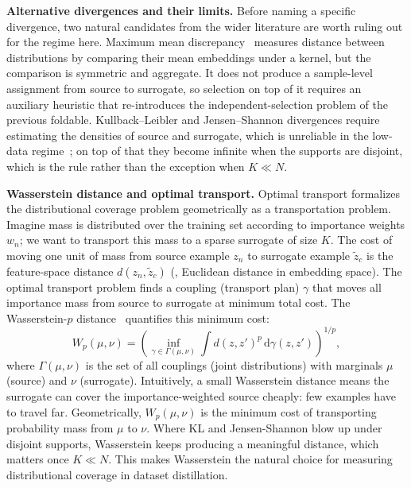 \begin{foldable}
  \textbf{Alternative divergences and their limits.}
  Before naming a specific divergence, two natural candidates from the wider literature are worth ruling out for the regime here.
  Maximum mean discrepancy~\cite{gretton2012kernel} measures distance between distributions by comparing their mean embeddings under a kernel, but the comparison is symmetric and aggregate.
  It does not produce a sample-level assignment from source to surrogate, so selection on top of it requires an auxiliary heuristic that re-introduces the independent-selection problem of the previous foldable.
  Kullback--Leibler and Jensen--Shannon divergences require estimating the densities of source and surrogate, which is unreliable in the low-data regime~\cite{paninski2003estimation}; on top of that they become infinite when the supports are disjoint, which is the rule rather than the exception when $K \ll N$.
\end{foldable}

\begin{foldable}
  \textbf{Wasserstein distance and optimal transport.}
  Optimal transport formalizes the distributional coverage problem geometrically as a transportation problem.
  Imagine mass is distributed over the training set according to importance weights $w_n$; we want to transport this mass to a sparse surrogate of size $K$.
  The cost of moving one unit of mass from source example $z_n$ to surrogate example $\tilde{z}_c$ is the feature-space distance $d(z_n, \tilde{z}_c)$ (\eg, Euclidean distance in embedding space).
  The optimal transport problem finds a coupling (transport plan) $\gamma$ that moves all importance mass from source to surrogate at minimum total cost.
  The Wasserstein-$p$ distance~\cite{villani2008optimal} quantifies this minimum cost:
  \begin{equation}
    \label{eq:wasserstein}
    W_p(\mu, \nu) = \left(\inf_{\gamma \in \Gamma(\mu,\nu)} \int d(z, z')^p \, \text{d}\gamma(z, z') \right)^{1/p},
  \end{equation}
  where $\Gamma(\mu, \nu)$ is the set of all couplings (joint distributions) with marginals $\mu$ (source) and $\nu$ (surrogate).
  Intuitively, a small Wasserstein distance means the surrogate can cover the importance-weighted source cheaply: few examples have to travel far.
  Geometrically, $W_p(\mu, \nu)$ is the minimum cost of transporting probability mass from $\mu$ to $\nu$.
  Where \ac{KL} and Jensen-Shannon blow up under disjoint supports, Wasserstein keeps producing a meaningful distance, which matters once $K \ll N$.
  This makes Wasserstein the natural choice for measuring distributional coverage in dataset distillation.
\end{foldable}

